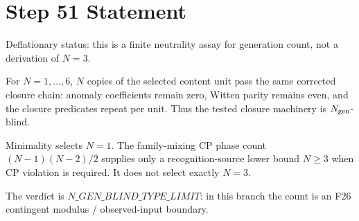 \documentclass[11pt]{article}
\begin{document}
\section*{Step 51 Statement}
Deflationary status: this is a finite neutrality assay for generation count, not a derivation of \(N=3\).

For \(N=1,\ldots,6\), \(N\) copies of the selected content unit pass the same corrected closure chain: anomaly coefficients remain zero, Witten parity remains even, and the closure predicates repeat per unit. Thus the tested closure machinery is \(N_{\rm gen}\)-blind.

Minimality selects \(N=1\). The family-mixing CP phase count \((N-1)(N-2)/2\) supplies only a recognition-source lower bound \(N\geq 3\) when CP violation is required. It does not select exactly \(N=3\).

The verdict is \(N\_GEN\_BLIND\_TYPE\_LIMIT\): in this branch the count is an F26 contingent modulus / observed-input boundary.
\end{document}

